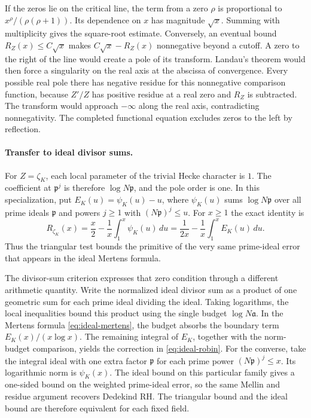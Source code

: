 \documentclass[11pt]{amsart}
\theoremstyle{definition}
\theoremstyle{remark}
\numberwithin{equation}{section}
\begin{document}
If the zeros lie on the critical line, the term from a zero \(\rho\)
is proportional to \(x^\rho/(\rho(\rho+1))\). Its dependence on \(x\)
has magnitude \(\sqrt{x}\). Summing with multiplicity gives the
square-root estimate. Conversely, an eventual bound
\(R_Z(x)\le C\sqrt{x}\) makes \(C\sqrt{x}-R_Z(x)\) nonnegative
beyond a cutoff. A zero to the right of the line would create a pole of
its transform. Landau's theorem would then force a singularity on the
real axis at the abscissa of convergence. Every possible real pole
there has negative residue for this nonnegative comparison function,
because \(Z'/Z\) has positive residue at a real zero and \(R_Z\)
is subtracted. The transform would approach \(-\infty\) along the real
axis, contradicting nonnegativity. The completed functional equation
excludes zeros to the left by reflection.

\paragraph{Transfer to ideal divisor sums.}

For \(Z=\zeta_K\), each local parameter of the trivial Hecke
character is \(1\). The coefficient at \(\mathfrak p^j\) is therefore
\(\log N\mathfrak p\), and the pole order is one. In this specialization,
put \(E_K(u)=\psi_K(u)-u\), where \(\psi_K(u)\) sums \(\log N\mathfrak p\)
over all prime ideals \(\mathfrak p\) and powers \(j\geq1\) with
\((N\mathfrak p)^j\leq u\). For \(x\geq1\) the exact identity is
\[
 R_{\zeta_K}(x)
   =\frac{x}{2}-\frac1x\int_1^x\psi_K(u)\,du
   =\frac{1}{2x}-\frac1x\int_1^x E_K(u)\,du .
\]
Thus the triangular test bounds the primitive of the very same
prime-ideal error that appears in the ideal Mertens formula.

The divisor-sum criterion expresses that zero condition through a
different arithmetic quantity. Write the normalized ideal divisor sum
as a product of one geometric sum for each prime ideal dividing the
ideal. Taking logarithms, the local inequalities bound this product
using the single budget \(\log N\mathfrak a\). In the Mertens formula
\eqref{eq:ideal-mertens}, the budget absorbs the boundary term
\(E_K(x)/(x\log x)\). The remaining integral of \(E_K\), together
with the norm-budget comparison, yields the correction in
\eqref{eq:ideal-robin}. For the converse, take the integral ideal with
one extra factor \(\mathfrak p\) for each prime power
\((N\mathfrak p)^j\leq x\). Its logarithmic norm is \(\psi_K(x)\).
The ideal bound on this particular family gives a one-sided bound on
the weighted prime-ideal error, so the same Mellin and residue argument
recovers Dedekind RH. The triangular bound and the ideal bound are
therefore equivalent for each fixed field.
\end{document}
